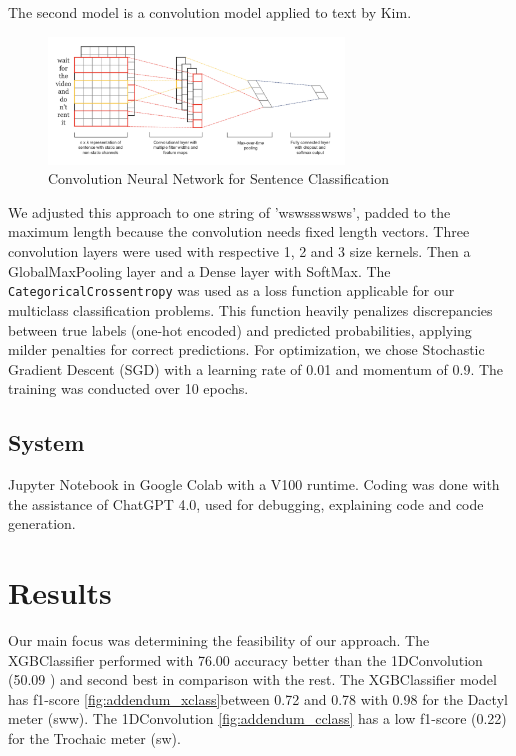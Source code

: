 \documentclass{article}
\begin{document}
The second model is a convolution model applied to text by Kim. \cite{kim-2014-convolutional}

\begin{figure}[h!]
 \centering
 \includegraphics[width=0.7\textwidth]{images/koon.png}
 \caption{Convolution Neural Network for Sentence Classification  }
\end{figure}

We adjusted this approach to one string of 'wswssswsws', padded to the maximum length because the convolution needs fixed length vectors. Three convolution layers were used with respective 1, 2 and 3 size kernels. Then a GlobalMaxPooling layer and a Dense layer with SoftMax. The \verb|CategoricalCrossentropy| was used as a loss function applicable for our multiclass classification problems.  This function heavily penalizes discrepancies between true labels (one-hot encoded) and predicted probabilities, applying milder penalties for correct predictions. For optimization, we chose Stochastic Gradient Descent (SGD) with a learning rate of 0.01 and momentum of 0.9. The training was conducted over 10 epochs.
        
\subsection{System}
Jupyter Notebook in Google Colab with a  V100 runtime. Coding was done with the assistance of ChatGPT 4.0,  used for debugging, explaining code and code generation. 


\section{Results}

Our main focus was determining the feasibility of our approach. The  XGBClassifier performed with 76.00 accuracy better than the 1DConvolution (50.09 ) and second best in comparison with the rest. The XGBClassifier model has f1-score \ref{fig:addendum_xclass}between 0.72 and 0.78 with 0.98 for the Dactyl meter (sww). The 1DConvolution \ref{fig:addendum_cclass} has a low f1-score (0.22) for the Trochaic meter (sw). 
\end{document}
